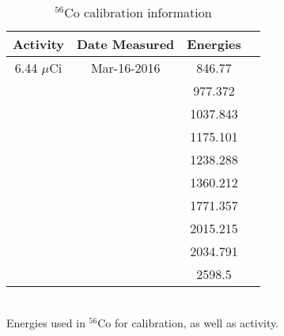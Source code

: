 \begin{table}[]
    \centering
    \caption{$^{56}$Co calibration information}
    \label{tab:Co_Energy}
    \begin{tabular}{c|c|c|c}
         Activity & Date Measured & Energies  \\ \hline
         6.44 $\mu$Ci & Mar-16-2016 & 846.77 \\
         & & 977.372 \\
         & & 1037.843 \\
         & & 1175.101 \\
         & & 1238.288 \\
         & & 1360.212 \\
         & & 1771.357 \\
         & & 2015.215 \\
         & & 2034.791 \\
         & & 2598.5 \\
    \end{tabular}
    \\[2]
    \footnotesize
    Energies used in $^{56}$Co for calibration, as well as activity.
\end{table}